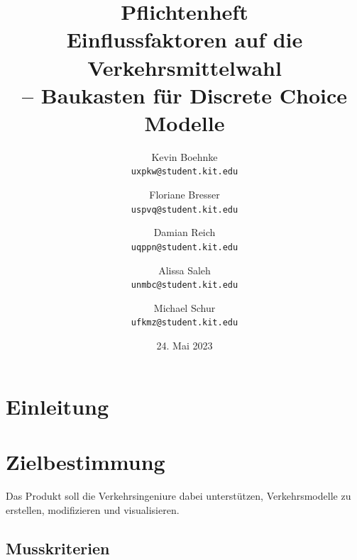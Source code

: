 \documentclass{article}
\title{Pflichtenheft \\ \large Einflussfaktoren auf die Verkehrsmittelwahl\\ -- Baukasten für Discrete Choice Modelle}
\author{Kevin Boehnke \\ \texttt{uxpkw@student.kit.edu}
\and Floriane Bresser \\ \texttt{uspvq@student.kit.edu}
\and Damian Reich \\ \texttt{uqppn@student.kit.edu}
\and Alissa Saleh \\ \texttt{unmbc@student.kit.edu}
\and Michael Schur \\ \texttt{ufkmz@student.kit.edu}}
\date{24. Mai 2023}
\begin{document}
\clearpage\maketitle\thispagestyle{empty}
\newpage
\clearpage\tableofcontents\thispagestyle{empty}
\newpage
{}

\section{Einleitung}

\section{Zielbestimmung}
Das Produkt soll die Verkehrsingeniure dabei unterstützen, Verkehrsmodelle zu erstellen, modifizieren und visualisieren.
\subsection{Musskriterien}
\end{document}
